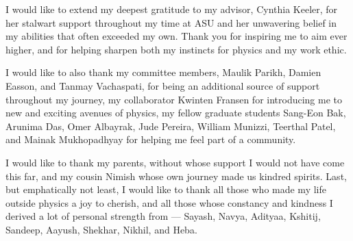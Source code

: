 I would like to extend my deepest gratitude to my advisor, Cynthia Keeler, for her stalwart support throughout my
time at ASU and her unwavering belief in my abilities that often exceeded my own. Thank you for inspiring me
to aim ever higher, and for helping sharpen both my instincts for physics and my work ethic.

I would like to also thank my committee members, Maulik Parikh, Damien Easson, and Tanmay Vachaspati, for being an
additional source of support throughout my journey, my collaborator Kwinten Fransen for introducing me to new and
exciting avenues of physics, my fellow graduate students Sang-Eon Bak, Arunima Das, Omer Albayrak, Jude
Pereira, William Munizzi, Teerthal Patel, and Mainak Mukhopadhyay for helping me feel part of a community.

I would like to thank my parents, without whose support I would not have come this far, and my cousin Nimish whose
own journey made us kindred spirits. Last, but emphatically not least, I would like to thank all those who made my
life outside physics a joy to cherish, and all those whose constancy and kindness I derived a lot of personal
strength from --- Sayash, Navya, Adityaa, Kshitij, Sandeep, Aayush, Shekhar, Nikhil, and Heba.
